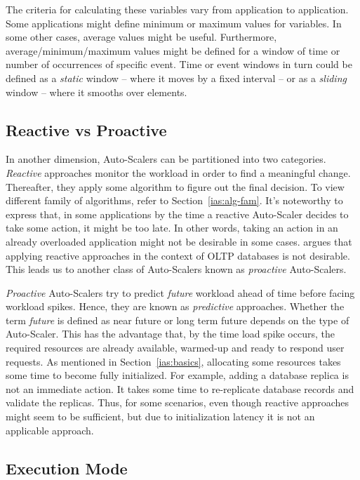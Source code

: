 The criteria for calculating these variables vary from application to application. Some applications might define minimum or maximum values for variables. In some other cases, average values might be useful. Furthermore, average/minimum/maximum values might be defined for a window of time or number of occurrences of specific event. Time or event windows in turn could be defined as a \emph{static} window -- where it moves by a fixed interval -- or as a \emph{sliding} window -- where it smooths over elements.
\subsection{Reactive vs Proactive}
\label{ias:react-proact}

In another dimension, Auto-Scalers can be partitioned into two categories. \emph{Reactive} approaches monitor the workload in order to find a meaningful change. Thereafter, they apply some algorithm to figure out the final decision. To view different family of algorithms, refer to Section~\ref{ias:alg-fam}. It's noteworthy to express that, in some applications by the time a reactive Auto-Scaler decides to take some action, it might be too late. In other words, taking an action in an already overloaded application might not be desirable in some cases. \textcite{Taft:2018} argues that applying reactive approaches in the context of OLTP databases is not desirable. This leads us to another class of Auto-Scalers known as \emph{proactive} Auto-Scalers.

\emph{Proactive} Auto-Scalers try to predict \emph{future} workload ahead of time before facing workload spikes. Hence, they are known as \emph{predictive} approaches. Whether the term \emph{future} is defined as near future or long term future depends on the type of Auto-Scaler. This has the advantage that, by the time load spike occurs, the required resources are already available, warmed-up and ready to respond user requests. As mentioned in Section~\ref{ias:basics}, allocating some resources takes some time to become fully initialized. For example, adding a database replica is not an immediate action. It takes some time to re-replicate database records and validate the replicas. Thus, for some scenarios, even though reactive approaches might seem to be sufficient, but due to initialization latency it is not an applicable approach.

\subsection{Execution Mode}
\label{ias:exec-mode}

